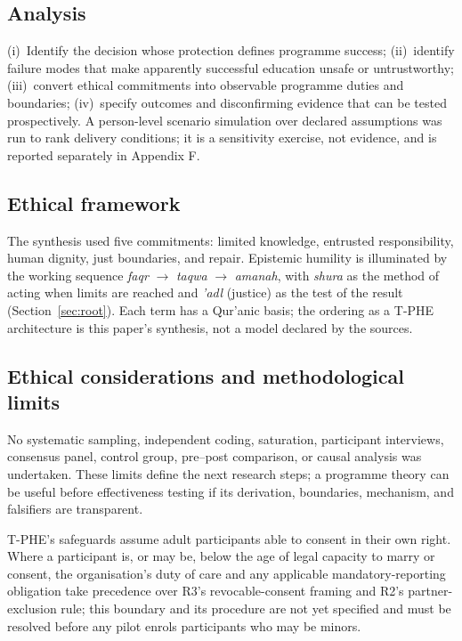 \documentclass[10pt,twocolumn]{article}
\newcommand{\tphe}{T\mbox{-}PHE}
\begin{document}
\subsection{Analysis}
(i)~Identify the decision whose protection defines programme success; (ii)~identify failure modes that make apparently successful education unsafe or untrustworthy; (iii)~convert ethical commitments into observable programme duties and boundaries; (iv)~specify outcomes and disconfirming evidence that can be tested prospectively. A person-level scenario simulation over declared assumptions was run to rank delivery conditions; it is a sensitivity exercise, not evidence, and is reported separately in Appendix F.

\subsection{Ethical framework}
The synthesis used five commitments: limited knowledge, entrusted responsibility, human dignity, just boundaries, and repair. Epistemic humility is illuminated by the working sequence \emph{faqr} $\rightarrow$ \emph{taqwa} $\rightarrow$ \emph{amanah}, with \emph{shura} as the method of acting when limits are reached and \emph{'adl} (justice) as the test of the result (Section~\ref{sec:root}). Each term has a Qur'anic basis; the ordering as a \tphe{} architecture is this paper's synthesis, not a model declared by the sources.

\subsection{Ethical considerations and methodological limits}
No systematic sampling, independent coding, saturation, participant interviews, consensus panel, control group, pre--post comparison, or causal analysis was undertaken. These limits define the next research steps; a programme theory can be useful before effectiveness testing if its derivation, boundaries, mechanism, and falsifiers are transparent.

\tphe{}'s safeguards assume adult participants able to consent in their own right. Where a participant is, or may be, below the age of legal capacity to marry or consent, the organisation's duty of care and any applicable mandatory-reporting obligation take precedence over R3's revocable-consent framing and R2's partner-exclusion rule; this boundary and its procedure are not yet specified and must be resolved before any pilot enrols participants who may be minors.
\end{document}
